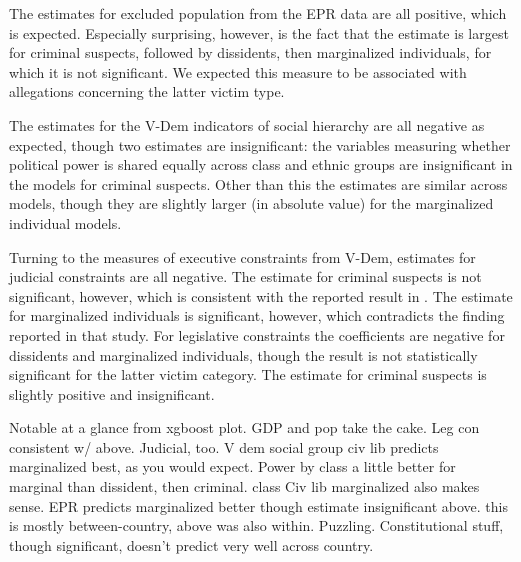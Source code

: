 \documentclass[11pt]{article}
\begin{document}
The estimates for excluded population from the EPR data are all positive, which is expected. Especially surprising, however, is the fact that the estimate is largest for criminal suspects, followed by dissidents, then marginalized individuals, for which it is not significant. We expected this measure to be associated with allegations concerning the latter victim type. 

The estimates for the V-Dem indicators of social hierarchy are all negative as expected, though two estimates are insignificant: the variables measuring whether political power is shared equally across class and ethnic groups are insignificant in the models for criminal suspects. Other than this the estimates are similar across models, though they are slightly larger (in absolute value) for the marginalized individual models.   

Turning to the measures of executive constraints from V-Dem, estimates for judicial constraints are all negative. The estimate for criminal suspects is not significant, however, which is consistent with the reported result in \citet{JacksonHillHall2018}. The estimate for marginalized individuals is significant, however, which contradicts the finding reported in that study. For legislative constraints the coefficients are negative for dissidents and marginalized individuals, though the result is not statistically significant for the latter victim category. The estimate for criminal suspects is slightly positive and insignificant. 

Notable at a glance from xgboost plot. GDP and pop take the cake. Leg con consistent w/ above. Judicial, too. V dem social group civ lib predicts marginalized best, as you would expect. Power by class a little better for marginal than dissident, then criminal. class Civ lib marginalized also makes sense. EPR predicts marginalized better though estimate insignificant above. this is mostly between-country, above was also within. Puzzling. Constitutional stuff, though significant, doesn't predict very well across country. 

\end{document}
